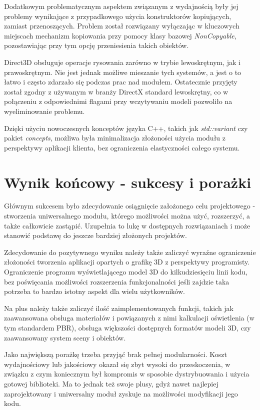 Dodatkowym problematycznym aspektem związanym z wydajnością były jej problemy wynikające z przypadkowego użycia konstruktorów kopiujących, zamiast przenoszących. Problem został rozwiązany wyłączając w kluczowych miejscach mechanizm kopiowania przy pomocy klasy bazowej \textit{NonCopyable}, pozostawiając przy tym opcję przeniesienia takich obiektów.

Direct3D obsługuje operacje rysowania zarówno w trybie lewoskrętnym, jak i prawoskrętnym. Nie jest jednak możliwe mieszanie tych systemów, a jest o to łatwo i często zdarzało się podczas prac nad modułem. Ostatecznie przyjęty został zgodny z używanym w branży DirectX standard lewoskrętny, co w połączeniu z odpowiednimi flagami przy wczytywaniu modeli pozwoliło na wyeliminowanie problemu. 

Dzięki użyciu nowoczesnych konceptów języka C++, takich jak \textit{std::variant} czy pakiet \textit{concepts}, możliwa była minimalizacja złożoności użycia modułu z perspektywy aplikacji klienta, bez ograniczenia elastyczności całego systemu. 

\section{Wynik końcowy - sukcesy i porażki}
Głównym sukcesem było zdecydowanie osiągnięcie założonego celu projektowego - stworzenia uniwersalnego modułu, którego możliwości można użyć, rozszerzyć, a także całkowicie zastąpić. Uzupełnia to lukę w dostępnych rozwiązaniach i może stanowić podstawę do jeszcze bardziej złożonych projektów.

Zdecydowanie do pozytywnego wyniku należy także zaliczyć wyraźne ograniczenie złożoności tworzenia aplikacji opartych o grafikę 3D z perspektywy programisty. Ograniczenie programu wyświetlającego model 3D do kilkudziesięciu linii kodu, bez poświęcania możliwości rozszerzenia funkcjonalności jeśli zajdzie taka potrzeba to bardzo istotny aspekt dla wielu użytkowników.

Na plus należy także zaliczyć ilość zaimplementowanych funkcji, takich jak zaawansowana obsługa materiałów i powiązanych z nimi kalkulacji oświetlenia (w tym standardem PBR), obsługa większości dostępnych formatów modeli 3D, czy zaawansowany system sceny i obiektów.

Jako największą porażkę trzeba przyjąć brak pełnej modularności. Koszt wydajnościowy lub jakościowy okazał się zbyt wysoki do przeskoczenia, w związku z czym koniecznym był kompromis w sposobie dystrybuowania i użycia gotowej biblioteki. Ma to jednak też swoje plusy, gdyż nawet najlepiej zaprojektowany i uniwersalny moduł zyskuje na możliwości modyfikacji jego kodu. 

